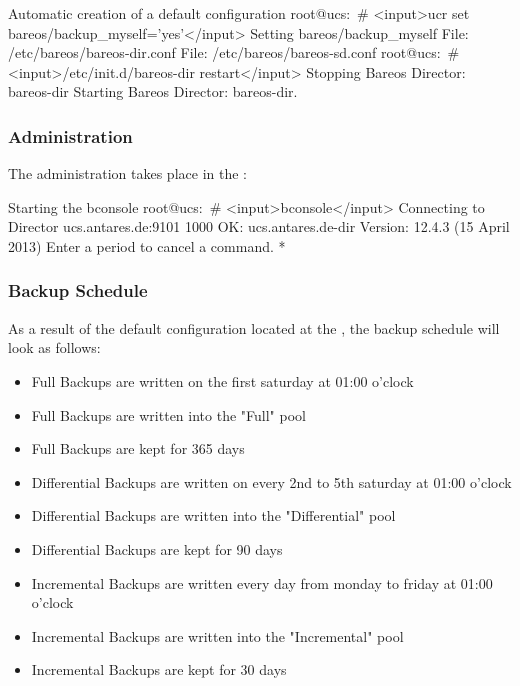 \begin{commands}{Automatic creation of a default configuration}
root@ucs:~# <input>ucr set bareos/backup_myself='yes'</input>
Setting bareos/backup_myself
File: /etc/bareos/bareos-dir.conf
File: /etc/bareos/bareos-sd.conf
root@ucs:~# <input>/etc/init.d/bareos-dir restart</input>
Stopping Bareos Director: bareos-dir
Starting Bareos Director: bareos-dir.
\end{commands}


\subsubsection{Administration}

The administration takes place in the :

\begin{commands}{Starting the bconsole}
root@ucs:~# <input>bconsole</input>
Connecting to Director ucs.antares.de:9101
1000 OK: ucs.antares.de-dir Version: 12.4.3 (15 April 2013)
Enter a period to cancel a command.
*
\end{commands}



\subsubsection{Backup Schedule}

As a result of the default configuration located at the , the backup schedule will look as follows:

\begin{itemize}
 \item Full Backups are written on the first saturday at 01:00 o'clock
 \item Full Backups are written into the "Full" pool
 \item Full Backups are kept for 365 days
 \item Differential Backups are written on every 2nd to 5th saturday at 01:00 o'clock
 \item Differential Backups are written into the "Differential" pool
 \item Differential Backups are kept for 90 days
 \item Incremental Backups are written every day from monday to friday at 01:00 o'clock
 \item Incremental Backups are written into the "Incremental" pool
 \item Incremental Backups are kept for 30 days
\end{itemize}

